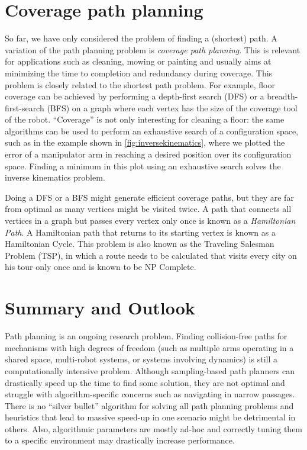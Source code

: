\section{Coverage path planning}

So far, we have only considered the problem of finding a (shortest) path. A variation of the path planning problem is \emph{coverage path planning}. This is relevant for applications such as cleaning, mowing or painting and usually aims at minimizing the time to completion and redundancy during coverage. This problem is closely related to the shortest path problem. For example, floor coverage can be achieved by performing a depth-first search (DFS) or a breadth-first-search (BFS) on a graph where each vertex has the size of the coverage tool of the robot. ``Coverage'' is not only interesting for cleaning a floor: the same algorithms can be used to perform an exhaustive search of a configuration space, such as in the example shown in \cref{fig:inversekinematics}, where we plotted the error of a manipulator arm in reaching a desired position over its configuration space. Finding a minimum in this plot using an exhaustive search solves the inverse kinematics problem. 

Doing a DFS or a BFS might generate efficient coverage paths, but they are far from optimal as many vertices might be visited twice. A path that connects all vertices in a graph but passes every vertex only once is known as a \textsl{Hamiltonian Path}. A Hamiltonian path that returns to its starting vertex is known as a Hamiltonian Cycle. This problem is also known as the Traveling Salesman Problem (TSP), in which a route needs to be calculated that visits every city on his tour only once and is known to be NP Complete.

\section{Summary and Outlook}

Path planning is an ongoing research problem. Finding collision-free paths for mechanisms with high degrees of freedom (such as multiple arms operating in a shared space, multi-robot systems, or systems involving dynamics) is still a computationally intensive problem.
Although sampling-based path planners can drastically speed up the time to find some solution, they are not optimal and struggle with algorithm-specific concerns such as navigating in narrow passages. There is no ``silver bullet'' algorithm for solving all path planning problems and heuristics that lead to massive speed-up in one scenario might be detrimental in others. Also, algorithmic parameters are mostly ad-hoc and correctly tuning them to a specific environment may drastically increase performance.

